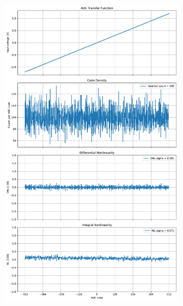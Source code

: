 \documentclass[varwidth]{standalone}
\begin{document}
\begin{figure}
\begin{subfigure}{0.32\textwidth}
    \includegraphics[width=\textwidth]{behavioral_10b_devnoise_nonlinearity.pdf}
\end{subfigure}
\begin{subfigure}{0.32\textwidth}

\end{subfigure}
\end{figure}
\end{document}
